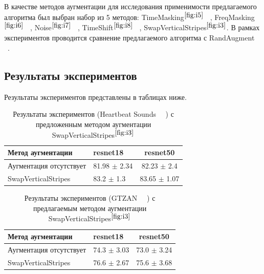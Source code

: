 \documentclass[12pt, fleqn]{article}
\begin{document}
В качестве методов аугментации для исследования применимости предлагаемого алгоритма был выбран набор из 5 методов: TimeMasking$^{\ref{fig:i5}}$ ~\cite{SpecAugment}, FreqMasking$^{\ref{fig:i6}}$ ~\cite{SpecAugment}, Noise$^{\ref{fig:i7}}$ ~\cite{AudioClassification}, TimeShift$^{\ref{fig:i8}}$ ~\cite{AudioClassification}, SwapVerticalStripes$^{\ref{fig:i3}}$. В рамках экспериментов проводится сравнение предлагаемого алгоритма с RandAugment ~\cite{RandAugment}.

\subsection{Результаты экспериментов}

Результаты экспериментов представлены в таблицах ниже.
\begin{table}[ht!]
    \centering
	\begin{tabular}{| l | l | c |}
    	\hline
	    Метод аугментации & resnet18 & resnet50 \\ \hline
	    Аугментация отсутствует  & 81.98 $\pm$ 2.34 & 82.23 $\pm$ 2.4 \\ \hline
	    SwapVerticalStripes & 83.2 $\pm$ 1.3 & 83.65 $\pm$ 1.07 \\ \hline
	\end{tabular}
	\caption{Результаты экспериментов (Heartbeat Sounds ~\cite{HeartbeatSoundsArticle}~\cite{HeartbeatSoundsKaggle}) с предложенным методом аугментации SwapVerticalStripes$^{\ref{fig:i3}}$}
	\label{table:lukianov_pavel_t1}
\end{table}

\begin{table}[ht!]
    \centering
	\begin{tabular}{| l | l | c |}
    	\hline
	    Метод аугментации & resnet18 & resnet50 \\ \hline
	    Аугментация отсутствует  & 74.3 $\pm$ 3.03 & 73.0 $\pm$ 3.24 \\ \hline
	    SwapVerticalStripes & 76.6 $\pm$ 2.67 & 75.6 $\pm$ 3.68 \\ \hline
	\end{tabular}
	\caption{Результаты экспериментов (GTZAN ~\cite{GTZAN_Article}~\cite{GTZAN_kaggle}) с предлагаемым методом аугментации SwapVerticalStripes$^{\ref{fig:i3}}$}
	\label{table:lukianov_pavel_t2}
\end{table}
\end{document}

